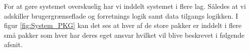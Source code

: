 
For at gøre systemet overskuelig har vi inddelt systemet i flere lag. Således at vi adskiller brugergrænseflade og forretnings logik samt data tilgangs logikken. I figur \ref{fig:System_PKG} kan det ses at hver af de store pakker er inddelt i flere små pakker som hver har deres eget ansvar hvilket vil blive beskrevet i følgende afsnit.
